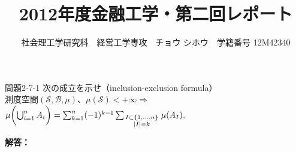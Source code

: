 \documentclass{jsarticle}
\begin{document}
\title{2012年度金融工学・第二回レポート}
\author{{\normalsize 社会理工学研究科　経営工学専攻　チョウ シホウ　学籍番号 12M42340}}
\date{}
\maketitle

\def \Pr{{\rm Pr}}


\baselineskip 0.6cm

\begin{itembox}[l]{問題2-7-1}
次の成立を示せ（inclusion-exclusion formula）\\
測度空間$(\mathcal{S},\mathcal{B},\mu)$、$\mu(\mathcal{S})<+\infty \Longrightarrow$
$\mu\biggl(\bigcup_{i=1}^n A_i\biggr)  =\sum_{k=1}^n (-1)^{k-1}\sum_{\scriptstyle I\subset\{1,\ldots,n\}\atop\scriptstyle|I|=k} \mu(A_I),$

\end{itembox}
{\bf 解答：}
\end{document}
